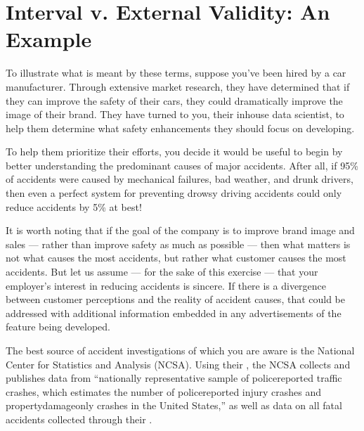 \documentclass[letterpaper,10pt,english]{jupyterBook}
\begin{document}
\section{Interval v. External Validity: An Example}
\label{\detokenize{30_questions/15_answering_exploratory_questions:interval-v-external-validity-an-example}}
\sphinxAtStartPar
To illustrate what is meant by these terms, suppose you’ve been hired by a car manufacturer. Through extensive market research, they have determined that if they can improve the safety of their cars, they could dramatically improve the image of their brand. They have turned to you, their in\sphinxhyphen{}house data scientist, to help them determine what safety enhancements they should focus on developing.

\sphinxAtStartPar
To help them prioritize their efforts, you decide it would be useful to begin by better understanding the predominant causes of major accidents. After all, if 95\% of accidents were caused by mechanical failures, bad weather, and drunk drivers, then even a perfect system for preventing drowsy driving accidents could only reduce accidents by 5\% at best!%
\begin{footnote}[1]\sphinxAtStartFootnote
It is worth noting that if the goal of the company is to improve brand image and sales — rather than improve safety as much as possible — then what matters is not what  causes the most accidents, but rather what customer  causes the most accidents. But let us assume — for the sake of this exercise — that your employer’s interest in reducing accidents is sincere. If there is a divergence between customer perceptions and the reality of accident causes, that could be addressed with additional information embedded in any advertisements of the feature being developed.
%
\end{footnote}

\sphinxAtStartPar
The best source of accident investigations of which you are aware is the  National Center for Statistics and Analysis (NCSA). Using their , the NCSA collects and publishes data from “nationally representative sample of police\sphinxhyphen{}reported traffic crashes, which estimates the number of police\sphinxhyphen{}reported injury crashes and property\sphinxhyphen{}damage\sphinxhyphen{}only crashes in the United States,” as well as data on all fatal accidents collected through their .
\end{document}
